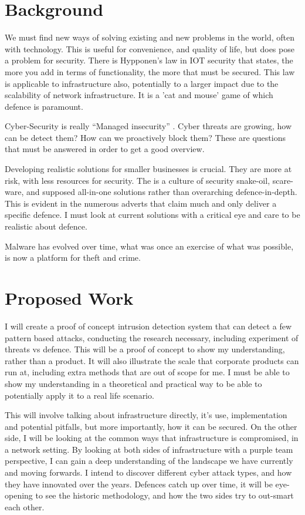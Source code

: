 
\section{Background}
We must find new ways of solving existing and new problems in the world, often with technology. 
This is useful for convenience, and quality of life, but does pose a problem for security. 
There is Hypponen's law in IOT security that states, the more you add in terms of functionality, the more that must be secured. \citep{hypponen}
This law is applicable to infrastructure also, potentially to a larger impact due to the scalability of network infrastructure.
It is a 'cat and mouse' game of which defence is paramount. \citep{cutandmouse}

Cyber-Security is really ``Managed insecurity'' \citep{ManagedInsecurity}.
Cyber threats are growing, how can be detect them? How can we proactively block them? These are questions that must be answered in order to get a good overview.

Developing realistic solutions for smaller businesses is crucial. They are more at risk, with less resources for security. \citep{sme}
The is a culture of security snake-oil, scare-ware, and supposed all-in-one solutions rather than overarching defence-in-depth. This is evident in the numerous adverts that claim much and only deliver a specific defence. \citep{SnakeOil}
I must look at current solutions with a critical eye and care to be realistic about defence. 

Malware has evolved over time, what was once an exercise of what was possible, is now a platform for theft and crime. \citep{malwareHistory}


\section{Proposed Work}
\label{proposed}
I will create a proof of concept intrusion detection system that can detect a few pattern based attacks, conducting the research necessary, including experiment of threats vs defence.
This will be a proof of concept to show my understanding, rather than a product. It will also illustrate the scale that corporate products can run at, including extra methods that are out of scope for me. 
I must be able to show my understanding in a theoretical and practical way to be able to potentially apply it to a real life scenario. 

This will involve talking about infrastructure directly, it's use, implementation and potential pitfalls, but more importantly, how it can be secured.
On the other side, I will be looking at the common ways that infrastructure is compromised, in a network setting. By looking at both sides of infrastructure with a purple team perspective, 
I can gain a deep understanding of the landscape we have currently and moving forwards.  I intend to discover different cyber attack types, and how they have innovated over the years. 
Defences catch up over time, it will be eye-opening to see the historic methodology, and how the two sides try to out-smart each other. \citep{malwareHistory}

